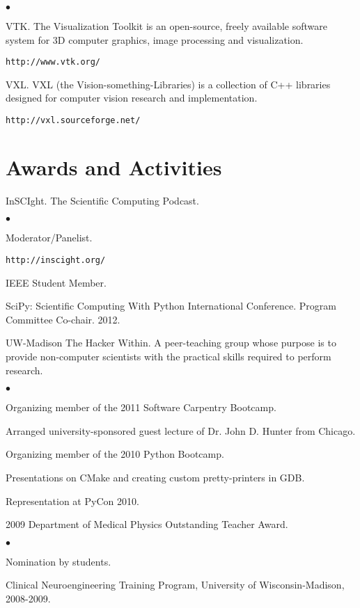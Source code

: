 \documentclass[margin,line]{res}
\newenvironment{list2}{
  \begin{list}{$\bullet$}{%
      \setlength{\itemsep}{0in}
      \setlength{\parsep}{0in} \setlength{\parskip}{0in}
      \setlength{\topsep}{0in} \setlength{\partopsep}{0in} 
      \setlength{\leftmargin}{0.2in}}}{\end{list}}
\begin{document}
\begin{resume}
\begin{list2}
\item VTK.  The Visualization Toolkit is an open-source, freely available
  software system for 3D computer graphics, image processing and visualization.
  \begin{verbatim}http://www.vtk.org/\end{verbatim}
\item VXL.  VXL (the Vision-something-Libraries) is a collection of C++
  libraries designed for computer vision research and implementation.
  \begin{verbatim}http://vxl.sourceforge.net/\end{verbatim}
\end{list2}

\section{\sc Awards and Activities}
InSCIght.  The Scientific Computing Podcast.
\begin{list2}
\item Moderator/Panelist.
\item \verb#http://inscight.org/#
\end{list2}

IEEE Student Member.

SciPy: Scientific Computing With Python International Conference.  Program
Committee Co-chair.  2012.

UW-Madison The Hacker Within.  A peer-teaching group whose purpose is to provide
non-computer scientists with the practical skills required to perform research.
\begin{list2}
\item Organizing member of the 2011 Software Carpentry Bootcamp.
\item Arranged university-sponsored guest lecture of Dr. John D. Hunter from Chicago.
\item Organizing member of the 2010 Python Bootcamp.
\item Presentations on CMake and creating custom pretty-printers in GDB.
\item Representation at PyCon 2010.
\end{list2}

2009 Department of Medical Physics Outstanding Teacher Award.
\begin{list2}
\item  Nomination by students.
\end{list2}

Clinical Neuroengineering Training Program, University of Wisconsin-Madison,
2008-2009.


\end{resume}
\end{document}
